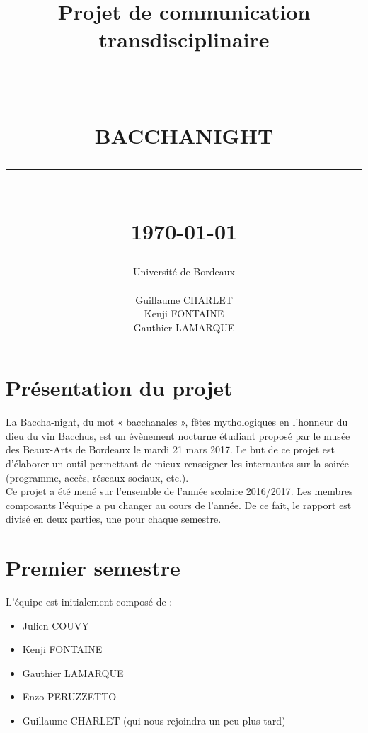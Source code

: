 \documentclass[11pt]{report}
\newcommand{\HRule}[1]{\rule{\linewidth}{#1}}
\renewcommand{\thesection}{\arabic{section}}
\begin{document}
\title
{
	\Large{Projet de communication transdisciplinaire}
	\HRule{2pt} \\ [0.5cm]
	\LARGE \textbf{\uppercase{Bacchanight}}
	\HRule{2pt} \\ [0.5cm]
	\normalsize \today
}

\date{}

\author
{
	\LARGE{Université de Bordeaux} \\
	\\
	Guillaume CHARLET \\
    Kenji FONTAINE \\
    Gauthier LAMARQUE \\
}

\maketitle


\renewcommand{\thesection}{\arabic{section}}

\section{Présentation du projet}

La Baccha-night, du mot « bacchanales », fêtes mythologiques en l’honneur du
dieu du vin Bacchus, est un évènement nocturne étudiant proposé par le musée
des Beaux-Arts de Bordeaux le mardi 21 mars 2017.
Le but de ce projet est d'élaborer un outil permettant de mieux renseigner
les internautes sur la soirée (programme, accès, réseaux sociaux, etc.). \\
Ce projet a été mené sur l'ensemble de l'année scolaire 2016/2017. Les membres
composants l'équipe a pu changer au cours de l'année. De ce fait, le rapport est
divisé en deux parties, une pour chaque semestre.

\section{Premier semestre}

L'équipe est initialement composé de :
\begin{itemize}
 	\item Julien COUVY
    \item Kenji FONTAINE
    \item Gauthier LAMARQUE
    \item Enzo PERUZZETTO
	\item Guillaume CHARLET (qui nous rejoindra un peu plus tard)
\end{itemize}
\end{document}
